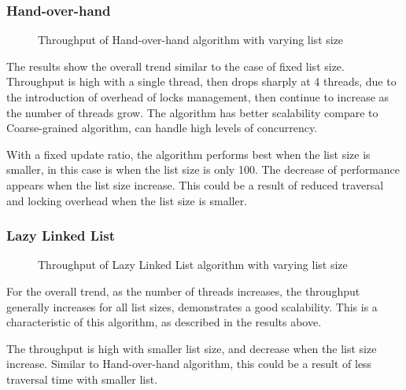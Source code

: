 \documentclass[12pt,a4paper]{article}
\begin{document}
\subsubsection{Hand-over-hand}
\begin{figure}[h]
    \centering
    \qquad
    \qquad
    \caption{Throughput of Hand-over-hand algorithm with varying list size}%
    \label{fig:fixed_update_hand_over_hand}%
\end{figure}

The results show the overall trend similar to the case of fixed list size. Throughput is high with a single thread, then drops sharply at 4 threads, due to the introduction of overhead of locks management, then continue to increase as the number of threads grow. The algorithm has better scalability compare to Coarse-grained algorithm, can handle high levels of concurrency.

With a fixed update ratio, the algorithm performs best when the list size is smaller, in this case is when the list size is only 100. The decrease of performance appears when the list size increase. This could be a result of reduced traversal and locking overhead when the list size is smaller.

\subsubsection{Lazy Linked List}
\begin{figure}[h]
    \centering
    \qquad
    \caption{Throughput of Lazy Linked List algorithm with varying list size}%
    \label{fig:fixed_update_lazy_linked_list)}%
\end{figure}

For the overall trend, as the number of threads increases, the throughput generally increases for all list sizes, demonstrates  a good scalability. This is a characteristic of this algorithm, as described in the results above. 

The throughput is high with smaller list size, and decrease when the list size increase. Similar to Hand-over-hand algorithm, this could be a result of less traversal time with smaller list. 
\end{document}
